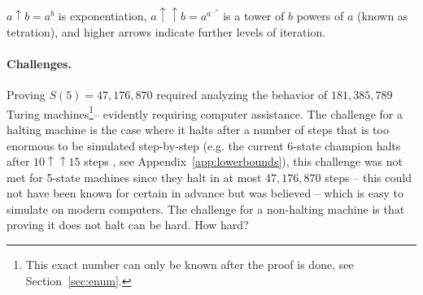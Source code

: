 \documentclass[a4paper,british]{article}
\theoremstyle{definition} %
\numberwithin{equation}{section}
\theoremstyle{definition} %
\newcommand{\BBtheFifth}{47{,}176{,}870}
\newcommand{\BBtheFifthTNF}{181{,}385{,}789}
\begin{document}
\begin{table}[h]
{        $a \uparrow b = a^b$ is exponentiation,
        $a \uparrow\uparrow b = a^{a^{\dots^a}}$ is a tower of $b$ powers of $a$ (known as tetration),
        and higher arrows indicate further levels of iteration.
    }
    \label{table:landscape}
\end{table}











\paragraph{Challenges.} Proving $S(5) = \BBtheFifth$ required analyzing the behavior of $\BBtheFifthTNF$ Turing machines\footnote{This exact number can only be known after the proof is done, see Section~\ref{sec:enum}.}-- evidently requiring computer assistance. The challenge for a halting machine is the case where it halts after a number of steps that is too enormous to be simulated step-by-step (e.g. the current 6-state champion halts after $10 \uparrow \uparrow 15$ steps \cite{Pavel_discorvery}, see Appendix~\ref{app:lowerbounds}), this challenge was not met for 5-state machines since they halt in at most $\BBtheFifth$ steps -- this could not have been known for certain in advance but was believed -- which is easy to simulate on modern computers. The challenge for a non-halting machine is that proving it does not halt can be hard. How hard?
\end{document}

